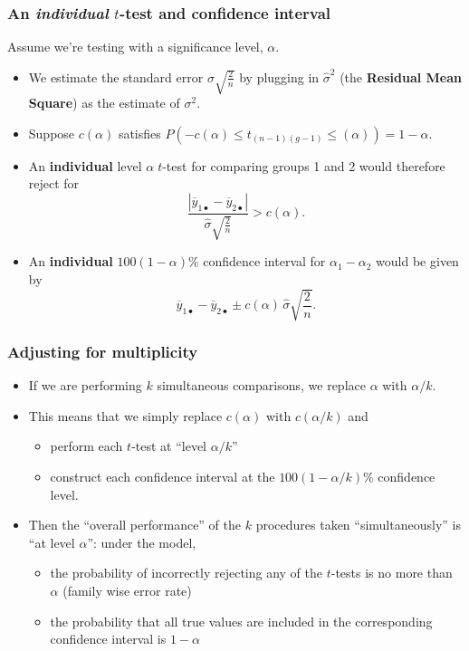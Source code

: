 \documentclass[a4paper]{article}\usepackage[]{graphicx}\usepackage[]{xcolor}
\begin{document}
\subsubsection{An \textit{individual} \( t \)-test and confidence interval}
Assume we're testing with a significance level, \( \alpha \).
\begin{itemize}
	\item We estimate the standard error \( \sigma \sqrt{\frac{2}{n}} \) by plugging in \( \hat{\sigma}^{2} \) (the \textbf{Residual Mean Square}) as the estimate of \( \sigma^{2} \).
	\item Suppose \( c(\alpha) \) satisfies \( P(-c(\alpha) \leq t_{(n-1)(g-1)} \leq(\alpha)) = 1 - \alpha \).
	\item An \textbf{individual} level \( \alpha\;t \)-test for comparing groups 1 and 2 would therefore reject for
	\[
		\frac{|\overline y_{1\bullet}-\overline y_{2\bullet}|}{\hat{\sigma}\sqrt{\frac{2}{n}}}>c(\alpha).
	\]
	\item An \textbf{individual} \( 100(1-\alpha)\% \) confidence interval for \( \alpha_1 - \alpha_2 \) would be given by
	\[
		\overline y_{1\bullet}-\overline y_{2\bullet}\pm c(\alpha)\,\hat{\sigma}\sqrt{\frac{2}{n}}.
	\]
\end{itemize}
\subsubsection{Adjusting for multiplicity}
\begin{itemize}
	\item If we are performing \( k \) simultaneous comparisons, we replace \( \alpha \) with \( \alpha / k \).
	\item This means that we simply replace \( c(\alpha) \) with \( c(\alpha / k) \) and
	\begin{itemize}
		\item perform each \( t \)-test at ``level \( \alpha / k \)''
		\item construct each confidence interval at the \( 100(1-\alpha / k)\% \) confidence level.
	\end{itemize}
	\item Then the ``overall performance'' of the \( k \) procedures taken ``simultaneously'' is ``at level 
	\( \alpha \)'': under the model,
	\begin{itemize}
		\item the probability of incorrectly rejecting any of the \( t \)-tests is no more than \( \alpha \)  (family wise error rate)
		\item the probability that all true values are included in the corresponding confidence interval is \( 1-\alpha \) 
	\end{itemize}
\end{itemize}
\end{document}
